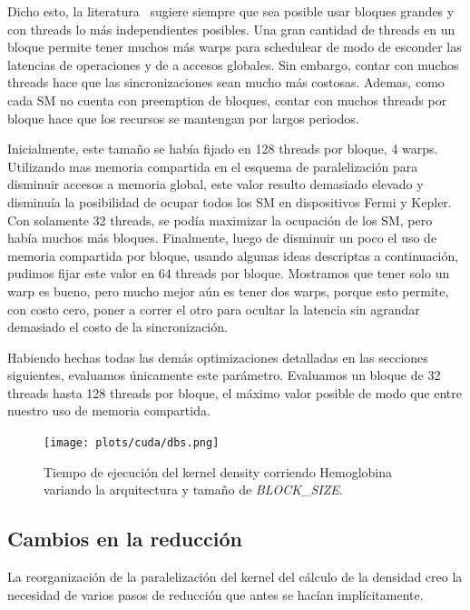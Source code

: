 Dicho esto, la literatura~\cite{farberCuda} sugiere siempre que sea posible
usar bloques grandes y con threads lo m\'as independientes posibles. Una gran cantidad de threads
en un bloque permite tener muchos m\'as warps para schedulear de modo de esconder las latencias de
operaciones y de a accesos globales. Sin embargo, contar con muchos threads hace que las
sincronizaciones sean mucho m\'as costosas. Ademas, como cada SM no cuenta con preemption
de bloques, contar con muchos threads por bloque hace que los recursos se mantengan
por largos periodos.

Inicialmente, este tama\~no se hab\'ia fijado en 128 threads por bloque, 4 warps. Utilizando
mas memoria compartida en el esquema de paralelizaci\'on para disminuir accesos a memoria global,
este valor resulto demasiado elevado y disminu\'ia la posibilidad de ocupar todos los SM en dispositivos
Fermi y Kepler. Con solamente 32 threads, se pod\'ia maximizar la ocupaci\'on de los SM, pero hab\'ia
muchos m\'as bloques. Finalmente, luego de disminuir un poco el uso de memoria compartida por
bloque, usando algunas ideas descriptas a continuaci\'on, pudimos fijar este valor en 64 threads
por bloque. Mostramos que tener solo un warp es bueno, pero mucho mejor a\'un es tener dos warps, porque
esto permite, con costo cero, poner a correr el otro para ocultar la latencia sin agrandar
demasiado el costo de la sincronizaci\'on.

Habiendo hechas todas las dem\'as optimizaciones detalladas en las secciones siguientes, evaluamos
\'unicamente este par\'ametro. Evaluamos un bloque de 32 threads hasta 128 threads por bloque,
el m\'aximo valor posible de modo que entre nuestro uso de memoria compartida.

\begin{figure}[htbp]
   \centering
   \texttt{[image: plots/cuda/dbs.png]}
   \caption{Tiempo de ejecuci\'on del kernel density corriendo Hemoglobina variando
   la arquitectura y tama\~no de \textit{BLOCK\_SIZE}.}
   \label{plt:dbs-runtime}
\end{figure}


\subsection{Cambios en la reducci\'on}
La reorganizaci\'on de la paralelizaci\'on del kernel del c\'alculo de la densidad creo la necesidad
de varios pasos de reducci\'on que antes se hac\'ian impl\'icitamente.

